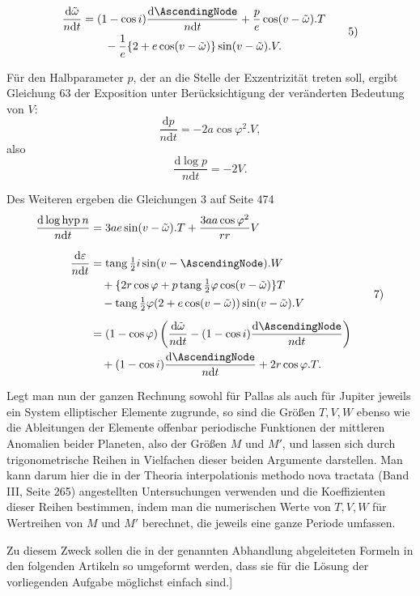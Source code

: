 \[
\begin{aligned}
\frac{\mathrm{d}\tilde\omega}{n\mathrm{d}t}
&=(1-\cos i)\frac{\mathrm{d}\AscendingNode}{n\mathrm{d}t}
+\frac{p}{e}\cos(v-\tilde\omega).T\\
&\qquad-\frac{1}{e}\{2+e\cos(v-\tilde\omega)\}\sin(v-\tilde\omega).V.
\end{aligned}
\tag*{5)}
\]
\par
Für den Halbparameter \(p\), der an die Stelle der Exzentrizität treten soll, ergibt Gleichung 63 der Exposition unter Berücksichtigung der veränderten Bedeutung von \(V\):
\[
\frac{\mathrm{d}p}{n\mathrm{d}t}=-2a\cos\varphi^2.V,
\]
also
\[
\frac{\mathrm{d}\log p}{n\mathrm{d}t}=-2V.
\tag*{6)}
\]
\par
Des Weiteren ergeben die Gleichungen 3 auf Seite 474
\[
\begin{aligned}
\frac{\mathrm{d}\log\operatorname{hyp} n}{n\mathrm{d}t}
&=3ae\sin(v-\tilde\omega).T+\frac{3aa\cos\varphi^2}{rr}V\\[.7em]
\frac{\mathrm{d}\varepsilon}{n\mathrm{d}t}
&=\operatorname{tang}\tfrac12 i\sin(v-\AscendingNode).W\\
&\quad+\{2r\cos\varphi+p\operatorname{tang}\tfrac12\varphi\cos(v-\tilde\omega)\}T\\
&\quad-\operatorname{tang}\tfrac12\varphi(2+e\cos(v-\tilde\omega))\sin(v-\tilde\omega).V\\[.5em]
&=(1-\cos\varphi)\left(\frac{\mathrm{d}\tilde\omega}{n\mathrm{d}t}
 -(1-\cos i)\frac{\mathrm{d}\AscendingNode}{n\mathrm{d}t}\right)\\
&\quad+(1-\cos i)\frac{\mathrm{d}\AscendingNode}{n\mathrm{d}t}
 +2r\cos\varphi.T.
\end{aligned}
\tag*{7)}
\]
\par
Legt man nun der ganzen Rechnung sowohl für Pallas als auch für Jupiter jeweils ein System elliptischer Elemente zugrunde, so sind die Größen \(T,V,W\) ebenso wie die Ableitungen der Elemente offenbar periodische Funktionen der mittleren Anomalien beider Planeten, also der Größen \(M\) und \(M'\), und lassen sich durch trigonometrische Reihen in Vielfachen dieser beiden Argumente darstellen. Man kann darum hier die in der Theoria interpolationis methodo nova tractata (Band III, Seite 265) angestellten Untersuchungen verwenden und die Koeffizienten dieser Reihen bestimmen, indem man die numerischen Werte von \(T,V,W\) für Wertreihen von \(M\) und \(M'\) berechnet, die jeweils eine ganze Periode umfassen.
\par
{}Zu diesem Zweck sollen die in der genannten Abhandlung abgeleiteten Formeln in den folgenden Artikeln so umgeformt werden, dass sie für die Lösung der vorliegenden Aufgabe möglichst einfach sind.]
\par
\endgroup
